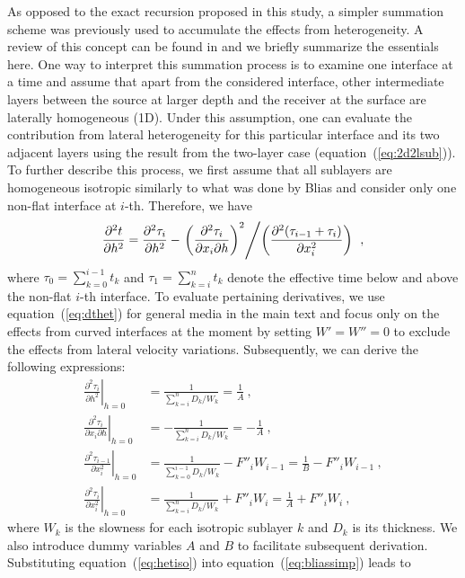 As opposed to the exact recursion proposed in this study, a simpler summation scheme was previously used to accumulate the effects from heterogeneity. A review of this concept can be found in \cite{blias2006} and we briefly summarize the essentials here. One way to interpret this summation process is to examine one interface at a time and assume that apart from the considered interface, other intermediate layers between the source at larger depth and the receiver at the surface are laterally homogeneous (1D). Under this assumption, one can evaluate the contribution from lateral heterogeneity for this particular interface and its two adjacent layers using the result from the two-layer case (equation~(\ref{eq:2d2lsub})). To further describe this process, we first assume that all sublayers are homogeneous isotropic similarly to what was done by Blias and consider only one non-flat interface at $i$-th. Therefore, we have
\begin{equation}
\label{eq:bliassimp}
\frac{\partial^2 t}{\partial h^2} = \frac{\partial^2 \tau_i}{\partial h^2} - \left. \left(\frac{\partial^2 \tau_i }{ \partial x_i \partial h}\right)^2 \middle/ \left(\frac{\partial^2 (\tau_{i-1}+\tau_i) }{ \partial x_i^2} \right) \right. ~,
\end{equation}
where $\tau_0 = \sum^{i-1}_{k=0} t_k$ and $\tau_1 = \sum^n_{k=i} t_k$ denote the effective time below and above the non-flat $i$-th interface. To evaluate pertaining derivatives, we use equation~(\ref{eq:dthet}) for general media in the main text and focus only on the effects from curved interfaces at the moment by setting $W' = W'' = 0$ to exclude the effects from lateral velocity variations. Subsequently, we can derive the following expressions:
\begin{align}
\label{eq:hetiso}
\left. \frac{\partial^2 \tau_i }{\partial h^2} \right\rvert_{h=0} & = \frac{1}{\sum^n_{k=i} D_k/W_k} = \frac{1}{A}~,\\
\nonumber
\left. \frac{\partial^2 \tau_i }{ \partial x_i \partial h} \right\rvert_{h=0} & =  -\frac{1}{\sum^n_{k=i} D_k/W_k} = -\frac{1}{A} ~,\\
\nonumber
\left. \frac{\partial^2 \tau_{i-1} }{ \partial x_i^2} \right\rvert_{h=0} & =  \frac{1}{\sum^{i-1}_{k=0} D_k/W_k}- F''_iW_{i-1} = \frac{1}{B} - F''_iW_{i-1}  ~,\\
\nonumber
\left. \frac{\partial^2 \tau_i }{ \partial x_i^2} \right\rvert_{h=0} & =  \frac{1}{\sum^n_{k=i} D_k/W_k}+ F''_iW_i = \frac{1}{A} + F''_iW_i~,
\end{align}
where $W_k$ is the slowness for each isotropic sublayer $k$ and $D_k$ is its thickness. We also introduce dummy variables $A$ and $B$ to facilitate subsequent derivation.  Substituting equation~(\ref{eq:hetiso}) into equation~(\ref{eq:bliassimp}) leads to
